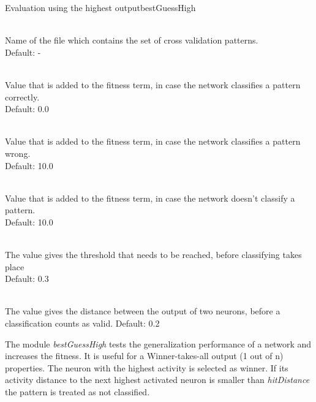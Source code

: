 \begin{moduledoc}{Evaluation using the highest output}{bestGuessHigh}


\item[\KeyWord{crossPattern} \optParam{name}]~\\
Name of the file which contains the set of cross validation patterns.\\
Default: -


\item[\KeyWord{hitRating} \optParam{f}]~\\
Value that is added to the fitness term, in case the network classifies a
pattern correctly.\\
Default: 0.0

\item[\KeyWord{missRating} \optParam{f}]~\\  
Value that is added to the fitness term, in case the network classifies a
pattern wrong.\\
Default: 10.0

\item[\KeyWord{noneRating} \optParam{f}]~\\ 
Value that is added to the fitness term, in case the network doesn't classify a
pattern.\\
Default: 10.0

\item[\KeyWord{hitThreshold} \optParam{f}]~\\ 
The value gives the threshold that needs to be reached, before classifying takes place\\
Default: 0.3

\item[\KeyWord{hitDistance} \optParam{f}]~\\ 
The value gives the distance between the output of two neurons, before a classification
counts as valid.
Default: 0.2


\end{moduledoc}


The module  {\it bestGuessHigh} tests the generalization performance of a network
and increases the fitness. It is useful for a Winner-takes-all output (1 out of n)
properties. The neuron with the highest activity is selected as winner. If its activity
distance to the next highest activated neuron is smaller than {\it hitDistance} 
the pattern is  treated as not classified.














